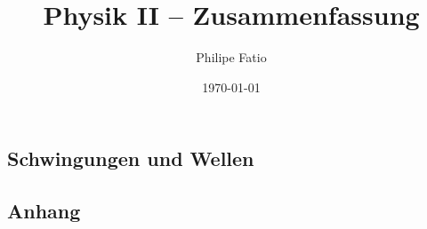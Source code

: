 \documentclass[9pt,fleqn,article,ngerman]{memoir}
\title{Physik II -- Zusammenfassung}
\date{\today}
\author{Philipe Fatio}
\numberwithin{equation}{section}
\begin{document}
\begin{multicols*}{3}
	\chapter{Schwingungen und Wellen} %
\end{multicols*}

\appendix
\begin{multicols*}{3}
	\chapter{Anhang}
\end{multicols*}
\end{document}
